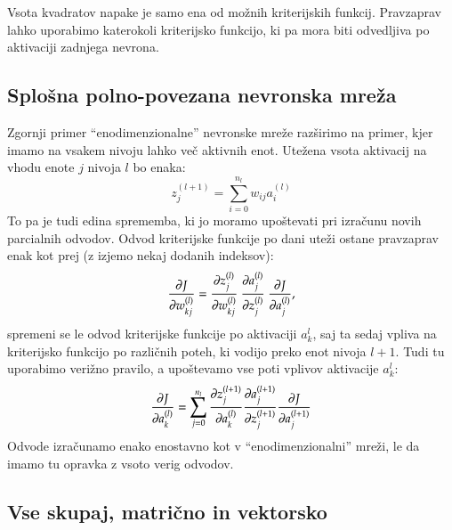 Vsota kvadratov napake je samo ena od možnih kriterijskih funkcij. Pravzaprav lahko uporabimo katerokoli kriterijsko funkcijo, ki pa mora biti odvedljiva po aktivaciji zadnjega nevrona.

\subsection{Splošna polno-povezana nevronska mreža}

Zgornji primer ``enodimenzionalne'' nevronske mreže razširimo na primer, kjer imamo na vsakem nivoju lahko več aktivnih enot. Utežena vsota aktivacij na vhodu enote $j$ nivoja $l$ bo enaka:
\begin{equation}
  z^{(l+1)}_j = \sum_{i=0}^{n_{l}} w_{ij} a_{i}^{(l)}
\end{equation}
\noindent To pa je tudi edina sprememba, ki jo moramo upoštevati pri izračunu novih parcialnih odvodov. Odvod kriterijske funkcije po dani uteži ostane pravzaprav enak kot prej (z izjemo nekaj dodanih indeksov):
\begin{equation}
  \pd{J}{w_{kj}^{(l)}} = \pd{z_j^{(l)}}{w_{kj}^{(l)}}\ \pd{a_j^{(l)}}{z_j^{(l)}}\ \pd{J}{a_j^{(l)}},
\end{equation}
\noindent spremeni se le odvod kriterijske funkcije po aktivaciji $a_k^l$, saj ta sedaj vpliva na kriterijsko funkcijo po različnih poteh, ki vodijo preko enot nivoja $l+1$. Tudi tu uporabimo verižno pravilo, a upoštevamo vse poti vplivov aktivacije $a_k^l$:
\begin{equation}
  \frac{\partial J}{\partial a_k^{(l)}} = \sum_{j=0}^{n_l} \frac{\partial z_j^{(l+1)}}{\partial a_k^{(l)}} \frac{\partial a_j^{(l+1)}}{\partial z_j^{(l+1)}} \frac{\partial J}{\partial a_j^{(l+1)}}
\end{equation}
\noindent Odvode izračunamo enako enostavno kot v ``enodimenzionalni'' mreži, le da imamo tu opravka z vsoto verig odvodov.

\subsection{Vse skupaj, matrično in vektorsko}

